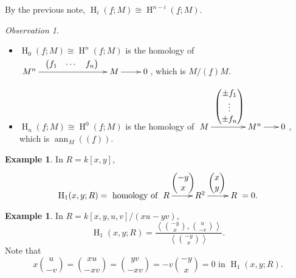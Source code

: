 \documentclass[11pt]{book}
\numberwithin{equation}{section}
\numberwithin{theorem}{chapter}
\theoremstyle{definition}
\newtheorem{example}[theorem]{Example}
\newtheorem*{basic properties}{Basic Properties}
\newtheorem*{Important Remark}{Important Remark}
\theoremstyle{remark}
\newtheorem{observation}[theorem]{Observation}
\newcommand{\ann}{\operatorname{ann}}
\renewcommand{\H}{\operatorname{H}}
\begin{document}
By the previous note, $\H_i(\underline{f};M) \cong \H^{n-i}(\underline{f};M)$.


\begin{observation}$\,$
\begin{itemize}
	\item $\H_0(\underline{f}; M) \cong \H^n(\underline{f};M)$ is the homology of $\xymatrix@C=8mm{M^n \ar[rrr]^{\begin{pmatrix} f_1 & \cdots & f_n \end{pmatrix}} &&& M \ar[r] & 0}$, which is $M/(\underline{f})M$.
	\item $\H_n(\underline{f}; M) \cong \H^0(\underline{f};M)$ is the homology of $\xymatrix@C=6mm{M \ar[rr]^{\begin{pmatrix} \pm f_1 \\ \vdots \\ \pm f_n \end{pmatrix}} && M^n \ar[r] & 0}$, which is $\ann_M((\underline{f}))$.
\end{itemize}	
\end{observation}


\begin{example}
	In $R = k[x,y]$,
	$$\H_1(x,y;R) = \textrm{ homology of } \xymatrix{R \ar[r]^{\begin{pmatrix} -y \\ x \end{pmatrix}} & R^2 \ar[r]^{\begin{pmatrix} x \\ y \end{pmatrix}} &R} = 0.$$
\end{example}


\begin{example}
	In $R = k[x,y,u,v]/(xu-yv)$,
	$$\H_1(x,y;R) = \frac{\left\langle {-y \choose x}, {u \choose -v} \right\rangle}{\left\langle {-y \choose x} \right\rangle}.$$
	Note that
	$$x {u \choose -v} = {xu \choose -xv} = {yv \choose -xv} = -v {-y \choose x} = 0 \textrm{ in } \H_1(x,y;R).$$
\end{example}
\end{document}
